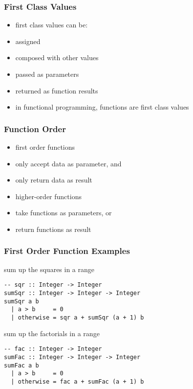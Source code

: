 \documentclass[dvipsnames]{beamer}
\theoremstyle{plain}
\begin{document}
\begin{frame}
  \frametitle{First Class Values}

  \begin{itemize}
    \item \alert{first class values} can be:

    \smallskip
    \item assigned
    \item composed with other values
    \item passed as parameters
    \item returned as function results

    \pause
    \bigskip
    \item in functional programming, functions are first class values
  \end{itemize}
\end{frame}

\begin{frame}[fragile]
  \frametitle{Function Order}

  \begin{itemize}
    \item \alert{first order functions}
    \smallskip
    \item only accept data as parameter, and
    \item only return data as result

    \pause
    \bigskip
    \item \alert{higher-order functions}
    \smallskip
    \item take functions as parameters, or
    \item return functions as result
  \end{itemize}
\end{frame}

\begin{frame}[fragile]
  \frametitle{First Order Function Examples}

  \begin{exampleblock}{sum up the squares in a range}
    \begin{lstlisting}
-- sqr :: Integer -> Integer
sumSqr :: Integer -> Integer -> Integer
sumSqr a b
  | a > b     = 0
  | otherwise = sqr a + sumSqr (a + 1) b
    \end{lstlisting}
  \end{exampleblock}

  \pause
  \begin{exampleblock}{sum up the factorials in a range}
    \begin{lstlisting}
-- fac :: Integer -> Integer
sumFac :: Integer -> Integer -> Integer
sumFac a b
  | a > b     = 0
  | otherwise = fac a + sumFac (a + 1) b
    \end{lstlisting}
  \end{exampleblock}
\end{frame}
\end{document}
